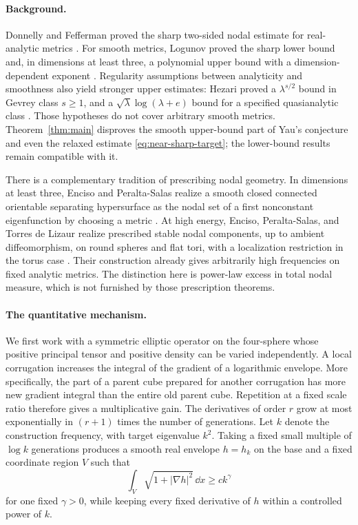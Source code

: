 \paragraph{Background.}
Donnelly and Fefferman proved the sharp two-sided nodal estimate for
real-analytic metrics \cite[Theorem~1.2]{DonnellyFefferman1988}.
For smooth metrics, Logunov proved the sharp lower bound
\cite[Theorem~1.1]{LogunovLower2018} and, in dimensions at least three,
a polynomial upper bound with a dimension-dependent exponent
\cite[Theorem~6.2]{LogunovUpper2018}.
Regularity assumptions between analyticity and smoothness also yield
stronger upper estimates: Hezari proved a $\lambda^{s/2}$ bound in
Gevrey class $s\ge1$, and a $\sqrt\lambda\log(\lambda+e)$ bound for a
specified quasianalytic class
\cite{Hezari2023}.
Those hypotheses do not cover arbitrary smooth metrics.
Theorem~\ref{thm:main} disproves the smooth upper-bound part of Yau's
conjecture and even the relaxed estimate \eqref{eq:near-sharp-target};
the lower-bound results remain compatible with it.

There is a complementary tradition of prescribing nodal geometry.
In dimensions at least three, Enciso and Peralta-Salas realize a smooth
closed connected orientable separating hypersurface as the nodal set of
a first nonconstant eigenfunction by choosing a metric
\cite{EncisoPeraltaSalas2015}. At high energy, Enciso, Peralta-Salas,
and Torres de Lizaur realize prescribed stable nodal components, up to
ambient diffeomorphism, on round spheres and flat tori, with a
localization restriction in the torus case
\cite{EncisoPeraltaSalasTorres2018}. Their construction already gives
arbitrarily high frequencies on fixed analytic metrics. The distinction
here is power-law excess in total nodal measure, which is not
furnished by those prescription theorems.

\paragraph{The quantitative mechanism.}
We first work with a symmetric elliptic operator on the four-sphere
whose positive principal tensor and positive density can be varied
independently. A local corrugation increases the integral of the
gradient of a logarithmic envelope. More specifically, the part of a
parent cube prepared for another corrugation has more new gradient
integral than the entire old parent cube. Repetition at a fixed scale
ratio therefore gives a multiplicative gain. The derivatives of order
$r$ grow at most exponentially in $(r+1)$ times the number of
generations. Let $k$ denote the construction frequency, with target
eigenvalue $k^2$. Taking a fixed small multiple of $\log k$ generations
produces a smooth real envelope $h=h_k$ on the base and a fixed
coordinate region $V$ such that
\[
 \int_V\sqrt{1+|\nabla h|^2}\,\dd x\ge c k^\gamma
\]
for one fixed $\gamma>0$, while keeping every fixed derivative of $h$
within a controlled power of $k$.

